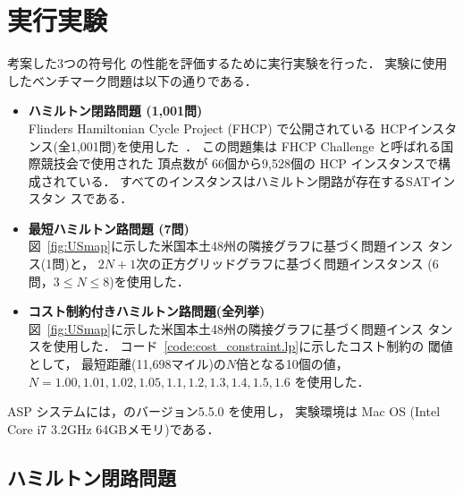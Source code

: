 ﻿%
\section{実行実験}\label{chap:experiment}

考案した3つの符号化
の性能を評価するために実行実験を行った．
実験に使用したベンチマーク問題は以下の通りである．

\begin{itemize}
\item \textbf{ハミルトン閉路問題 (1,001問)}\\
  Flinders Hamiltonian Cycle Project (FHCP) で公開されている
  HCPインスタンス(全1,001問)を使用した~\cite{haythorpe19:fhcp}．
  この問題集は FHCP Challenge と呼ばれる国際競技会で使用された
  頂点数が 66個から9,528個の HCP インスタンスで構成されている．
  すべてのインスタンスはハミルトン閉路が存在する\textsf{SAT}インスタン
  スである．
\item \textbf{最短ハミルトン路問題 (7問)}\\
  図~\ref{fig:USmap}に示した米国本土48州の隣接グラフに基づく問題インス
  タンス(1問)と，
  $2N+1$次の正方グリッドグラフに基づく問題インスタンス
  (6問，$3\leq N\leq 8$)を使用した．
\item \textbf{コスト制約付きハミルトン路問題(全列挙)}\\
  図~\ref{fig:USmap}に示した米国本土48州の隣接グラフに基づく問題インス
  タンスを使用した．
  コード~\ref{code:cost_constraint.lp}に示したコスト制約の
  閾値として，
  最短距離(11,698マイル)の$N$倍となる10個の値，
  $N=1.00,1.01,1.02,1.05,1.1,1.2,1.3,1.4,1.5,1.6$
  を使用した．
\end{itemize}

ASP システムには，{\clingo}のバージョン5.5.0 を使用し，
実験環境は Mac OS (Intel Core i7 3.2GHz 64GBメモリ)である．

\subsection{ハミルトン閉路問題}


